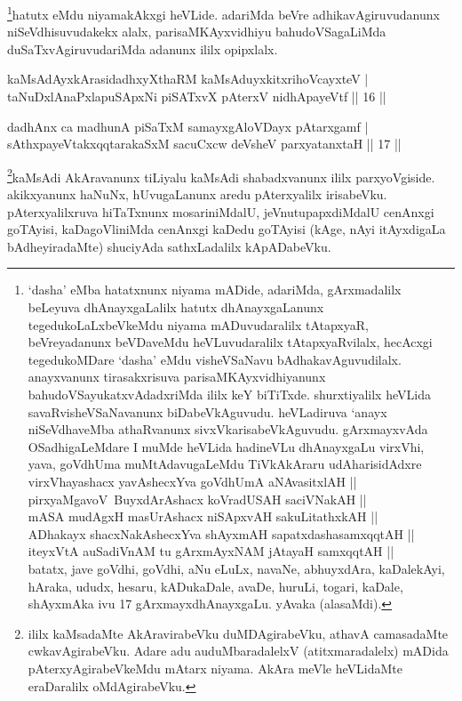 \begin{artha}
\footnote{`dasha' eMba hatatxnunx niyama mADide, adariMda, gArxmadalilx beLeyuva dhAnayxgaLalilx hatutx dhAnayxgaLanunx tegedukoLaLxbeVkeMdu niyama mADuvudaralilx tAtapxyaR, beVreyadanunx beVDaveMdu heVLuvudaralilx tAtapxyaRvilalx, hecAcxgi tegedukoMDare `dasha' eMdu visheVSaNavu bAdhakavAguvudilalx. anayxvanunx tirasakxrisuva parisaMKAyxvidhiyanunx bahudoVSayukatxvAdadxriMda ililx keY biTiTxde. shurxtiyalilx heVLida savaRvisheVSaNavanunx biDabeVkAguvudu. heVLadiruva `anayx niSeVdhaveMba athaRvanunx sivxVkarisabeVkAguvudu. gArxmayxvAda OSadhigaLeMdare I muMde heVLida hadineVLu dhAnayxgaLu \ndash  virxVhi, yava, goVdhUma muMtAdavugaLeMdu TiVkAkAraru udAharisidAdxre \mdash  \\ virxVhayashacx yavAshecxYva goVdhUmA aNAvasitxlAH ||\\
pirxyaMgavoV\ BuyxdArAshacx koVradUSAH saciVNakAH ||\\
mASA mudAgxH masUrAshacx niSApxvAH sakuLitathxkAH ||\\
ADhakayx shacxNakAshecxYva shAyxmAH sapatxdashasamxqqtAH ||\\
iteyxVtA auSadiVnAM tu gArxmAyxNAM jAtayaH samxqqtAH ||\\ batatx, jave goVdhi, goVdhi, aNu eLuLx, navaNe, abhuyxdAra, kaDalekAyi, hAraka, ududx, hesaru, kADukaDale, avaDe, huruLi, togari, kaDale, shAyxmAka ivu 17 gArxmayxdhAnayxgaLu. yAvaka (alasaMdi).}hatutx eMdu niyamakAkxgi heVLide. adariMda beVre adhikavAgiruvudanunx niSeVdhisuvudakekx alalx, parisaMKAyxvidhiyu bahudoVSagaLiMda duSaTxvAgiruvudariMda adanunx ililx opipxlalx.
\end{artha}



\begin{shl}
kaMsAdAyxkArasidadhxyXthaRM kaMsAduyxkitxrihoVcayxteV | \\
taNuDxlAnaPxlapuSApxNi piSATxvX pAterxV nidhApayeVtf \hfill|| 16 || 
\end{shl}

\begin{shl}
dadhAnx ca madhunA piSaTxM samayxgAloVDayx pAtarxgamf | \\
sAthxpayeVtakxqqtarakaSxM sacuCxcw deVsheV parxyatanxtaH \hfill|| 17 || 
\end{shl}

\begin{artha}
\footnote{ililx kaMsadaMte AkAravirabeVku duMDAgirabeVku, athavA camasadaMte cwkavAgirabeVku. Adare adu auduMbaradalelxV (atitxmaradalelx) mADida pAterxyAgirabeVkeMdu mAtarx niyama. AkAra meVle heVLidaMte eraDaralilx oMdAgirabeVku.}kaMsAdi AkAravanunx tiLiyalu kaMsAdi shabadxvanunx ililx parxyoVgiside. akikxyanunx haNuNx, hUvugaLanunx aredu pAterxyalilx irisabeVku. pAterxyalilxruva hiTaTxnunx mosariniMdalU, jeVnutupapxdiMdalU cenAnxgi goTAyisi, kaDagoVliniMda  cenAnxgi kaDedu goTAyisi (kAge, nAyi itAyxdigaLa bAdheyiradaMte) shuciyAda sathxLadalilx kApADabeVku.
\end{artha}

